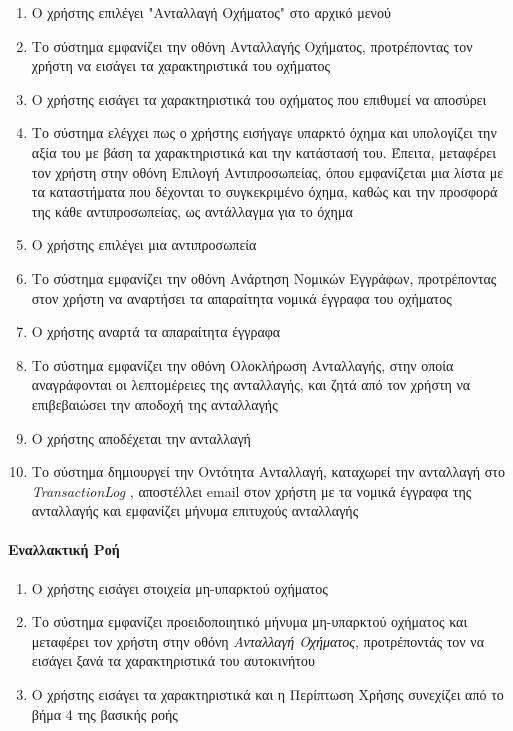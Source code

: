 \documentclass{../ol-softwaremanual}
\begin{document}
	\begin{enumerate}
		\item Ο χρήστης επιλέγει \en"\gr Ανταλλαγή Οχήματος\en" \gr στο αρχικό μενού
		\item Το σύστημα εμφανίζει την οθόνη Ανταλλαγής Οχήματος, προτρέποντας τον χρήστη να εισάγει τα χαρακτηριστικά του οχήματος 
		\item Ο χρήστης εισάγει τα χαρακτηριστικά του οχήματος που επιθυμεί να αποσύρει
		\item Το σύστημα ελέγχει πως ο χρήστης εισήγαγε υπαρκτό όχημα και υπολογίζει την αξία του με βάση τα χαρακτηριστικά και την κατάστασή του. Έπειτα, μεταφέρει τον χρήστη στην οθόνη Επιλογή Αντιπροσωπείας, όπου εμφανίζεται μια λίστα με τα καταστήματα που δέχονται το συγκεκριμένο όχημα, καθώς και την προσφορά της κάθε αντιπροσωπείας, ως αντάλλαγμα για το όχημα
		\item Ο χρήστης επιλέγει μια αντιπροσωπεία
		\item Το σύστημα εμφανίζει την οθόνη Ανάρτηση Νομικών Εγγράφων, προτρέποντας στον χρήστη να αναρτήσει τα απαραίτητα νομικά έγγραφα του οχήματος
		\item Ο χρήστης αναρτά τα απαραίτητα έγγραφα		
		\item Το σύστημα εμφανίζει την οθόνη Ολοκλήρωση Ανταλλαγής, στην οποία αναγράφονται οι λεπτομέρειες της ανταλλαγής, και ζητά από τον χρήστη να επιβεβαιώσει την αποδοχή της ανταλλαγής
		\item Ο χρήστης αποδέχεται την ανταλλαγή
		\item Το σύστημα δημιουργεί την Οντότητα Ανταλλαγή, καταχωρεί την ανταλλαγή στο \en \textit{TransactionLog} \gr, αποστέλλει \en email \gr στον χρήστη με τα νομικά έγγραφα της ανταλλαγής και εμφανίζει μήνυμα επιτυχούς ανταλλαγής		
	\end{enumerate}
	
	\paragraph{{Εναλλακτική Ροή}}
	
	\begin{enumerate}
		\item Ο χρήστης εισάγει στοιχεία μη-υπαρκτού οχήματος
		\item Το σύστημα εμφανίζει προειδοποιητικό μήνυμα μη-υπαρκτού οχήματος και μεταφέρει τον χρήστη στην οθόνη \textit{Ανταλλαγή Οχήματος}, προτρέποντάς τον να εισάγει ξανά τα χαρακτηριστικά του αυτοκινήτου
		\item Ο χρήστης εισάγει τα χαρακτηριστικά και η Περίπτωση Χρήσης συνεχίζει από το βήμα 4 της βασικής ροής
	\end{enumerate}
	
\end{document}
